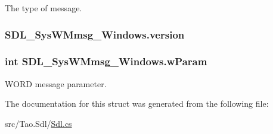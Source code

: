 The type of message. 

\hypertarget{struct_s_d_l___sys_w_mmsg___windows_ab7a3fd3021228a2aada9aa5611340660}{
\subsubsection[{version}]{ {\bf SDL\_\-SysWMmsg\_\-Windows.version}}}
\label{struct_s_d_l___sys_w_mmsg___windows_ab7a3fd3021228a2aada9aa5611340660}
\hypertarget{struct_s_d_l___sys_w_mmsg___windows_abdcc59f9c5289bf0b18c42902bf43406}{
\subsubsection[{wParam}]{\setlength{\rightskip}{0pt plus 5cm}int {\bf SDL\_\-SysWMmsg\_\-Windows.wParam}}}
\label{struct_s_d_l___sys_w_mmsg___windows_abdcc59f9c5289bf0b18c42902bf43406}


WORD message parameter. 



The documentation for this struct was generated from the following file:\begin{DoxyCompactItemize}
\item 
src/Tao.Sdl/\hyperlink{_sdl_8cs}{Sdl.cs}\end{DoxyCompactItemize}
